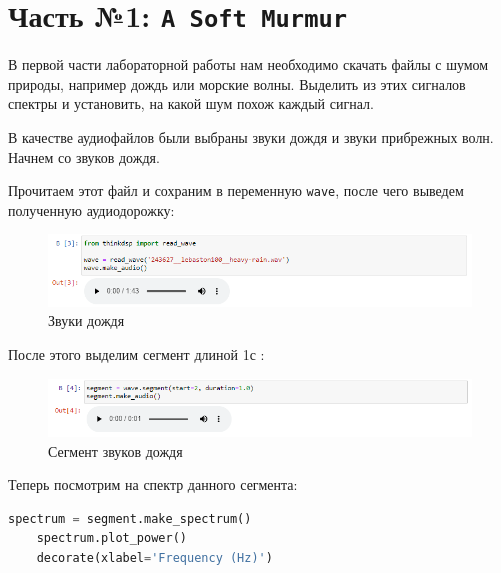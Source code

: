\documentclass[a4paper]{article}
\begin{document}
    \newpage
        \section{Часть №1: \texttt{A Soft Murmur}}
            В первой части лабораторной работы нам необходимо скачать файлы с шумом природы, например дождь или морские волны. Выделить из этих сигналов спектры и установить, на какой шум похож каждый сигнал.
            
            В качестве аудиофайлов были выбраны звуки дождя и звуки прибрежных волн. Начнем со звуков дождя.
            
            Прочитаем этот файл и сохраним в переменную \texttt{wave}, после чего выведем полученную аудиодорожку:
            
            \begin{figure}[H]
                \centering
                \includegraphics[width=\textwidth]{ex_1_rain_audio.png}
                \caption{Звуки дождя}
                \label{fig:ex_1_rain_audio}
            \end{figure}
            
            После этого выделим сегмент длиной 1с :
            
            \begin{figure}[H]
                \centering
                \includegraphics[width=\textwidth]{ex_1_rain_segment_audio.png}
                \caption{Сегмент звуков дождя}
                \label{fig:ex_1_rain_segment_audio}
            \end{figure}
            
            Теперь посмотрим на спектр данного сегмента:
            
\begin{lstlisting}[language=Python, caption= Получение спектра сегмента]
    spectrum = segment.make_spectrum()
    spectrum.plot_power()
    decorate(xlabel='Frequency (Hz)')
\end{lstlisting}               
            
\end{document}
